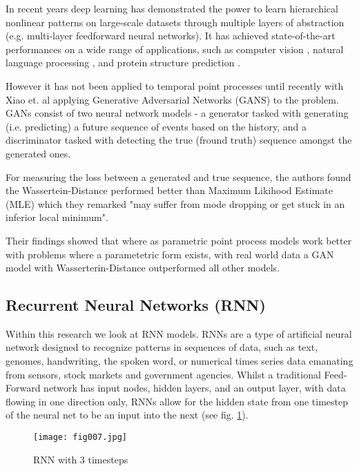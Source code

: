 In recent years deep learning has demonstrated the power to learn hierarchical nonlinear patterns on large-scale datasets \parencite{DL} through multiple layers of abstraction (e.g. multi-layer feedforward neural networks). It has achieved state-of-the-art performances on a wide range of applications, such as computer vision \parencite{ImageNet}, natural language processing \parencite{Socher}, and protein structure prediction \parencite{Lena}.

However it has not been applied to temporal point processes until recently with Xiao et. al \parencite{Wass} applying Generative Adversarial Networks (GANS) to the problem. GANs consist of two neural network models - a generator tasked with generating (i.e. predicting) a future sequence of events based on the history, and a discriminator tasked with detecting the true (fround truth) sequence amongst the generated ones.

For measuring the loss between a generated and true sequence, the authors found the Wassertein-Distance \parencite{WassGAN} performed better than Maximum Likihood Estimate (MLE) which they remarked "may suffer from mode dropping or get stuck in an inferior local minimum".

Their findings showed that where as parametric point process models work better with problems where a parametetric form exists, with real world data a GAN model with Wasserterin-Distance outperformed all other models. 

\subsection{Recurrent Neural Networks (RNN)}

Within this research we look at RNN models. RNNs are a type of artificial neural network designed to recognize patterns in sequences of data, such as text, genomes, handwriting, the spoken word, or numerical times series data emanating from sensors, stock markets and government agencies. Whilst a traditional Feed-Forward network \parencite{MLP} has input nodes, hidden layers, and an output layer, with data flowing in one direction only, RNNs allow for the hidden state from one timestep of the neural net to be an input into the next (see fig. \ref{RNN}).

\begin{figure}[h!]
	\centering
	\texttt{[image: fig007.jpg]}
	\caption{RNN with 3 timesteps}
	\label{RNN}
\end{figure} 

